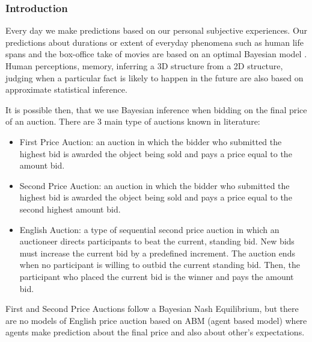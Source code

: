 

\subsubsection{Introduction}
Every day we make predictions based on our personal subjective experiences.
Our predictions about durations or extent of everyday phenomena such as human
 life spans and the box-office take of movies are based on an optimal
Bayesian model \citep{OptimalPredEveryDay}.
Human perceptions, memory, inferring a 3D structure from a 2D structure,
judging when a particular fact is likely to happen in the future are also
 based on approximate statistical inference.

It is possible then, that we use Bayesian inference when bidding on the final
 price of an auction.
There are 3 main type of auctions known in literature\citep{AuctionTypes}:
\begin{itemize}
 \item First Price Auction: an auction in which the bidder who submitted the
 highest bid is awarded the object being sold and pays a price equal to the amount bid.

 \item Second Price Auction: an auction in which the bidder who submitted the
 highest bid is awarded the object being sold and pays a price equal to the second highest amount bid.

 \item English Auction: a type of sequential second price auction  in which an
 auctioneer directs participants to beat the current, standing bid. New bids must
 increase the current bid by a predefined increment. The auction ends when no
 participant is willing to outbid the current standing bid. Then, the participant
 who placed the current bid is the winner and pays the amount bid.
\end{itemize}

First and Second Price Auctions follow a Bayesian Nash Equilibrium, but there are
 no models of English price auction based on ABM (agent based model) where agents
 make prediction about the final price and also about other's expectations.

